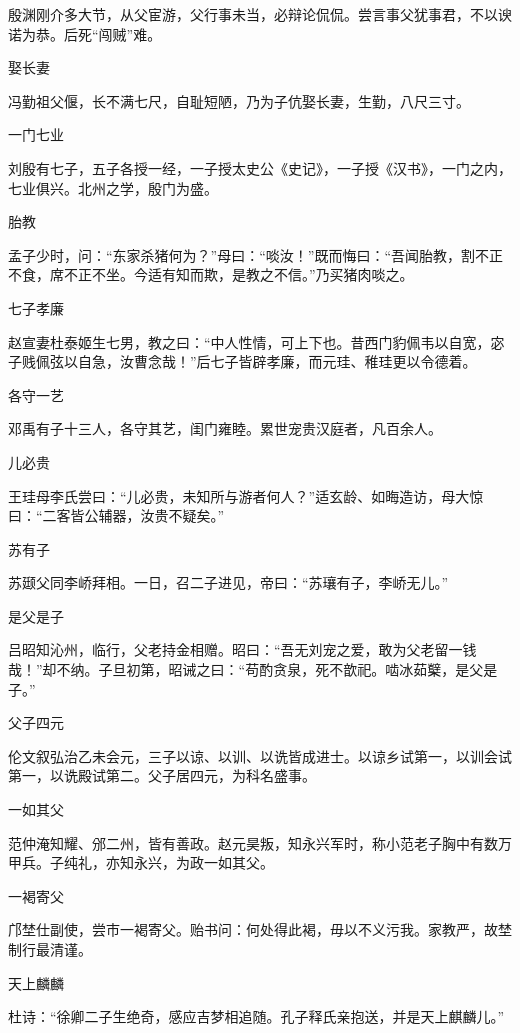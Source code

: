 \documentclass[a4paper,12pt,UTF8,twoside]{ctexbook}
\begin{document}
    殷渊刚介多大节，从父宦游，父行事未当，必辩论侃侃。尝言事父犹事君，不以谀诺为恭。后死“闯贼”难。
    
    娶长妻
    
    冯勤祖父偃，长不满七尺，自耻短陋，乃为子伉娶长妻，生勤，八尺三寸。
    
    一门七业
    
    刘殷有七子，五子各授一经，一子授太史公《史记》，一子授《汉书》，一门之内，七业俱兴。北州之学，殷门为盛。
    
    胎教
    
    孟子少时，问：“东家杀猪何为？”母曰：“啖汝！”既而悔曰：“吾闻胎教，割不正不食，席不正不坐。今适有知而欺，是教之不信。”乃买猪肉啖之。
    
    七子孝廉
    
    赵宣妻杜泰姬生七男，教之曰：“中人性情，可上下也。昔西门豹佩韦以自宽，宓子贱佩弦以自急，汝曹念哉！”后七子皆辟孝廉，而元珪、稚珪更以令德着。
    
    各守一艺
    
    邓禹有子十三人，各守其艺，闺门雍睦。累世宠贵汉庭者，凡百余人。
    
    儿必贵
    
    王珪母李氏尝曰：“儿必贵，未知所与游者何人？”适玄龄、如晦造访，母大惊曰：“二客皆公辅器，汝贵不疑矣。”
    
    苏有子
    
    苏颋父同李峤拜相。一日，召二子进见，帝曰：“苏瓖有子，李峤无儿。”
    
    是父是子
    
    吕昭知沁州，临行，父老持金相赠。昭曰：“吾无刘宠之爱，敢为父老留一钱哉！”却不纳。子旦初第，昭诫之曰：“苟酌贪泉，死不歆祀。啮冰茹櫱，是父是子。”
    
    父子四元
    
    伦文叙弘治乙未会元，三子以谅、以训、以诜皆成进士。以谅乡试第一，以训会试第一，以诜殿试第二。父子居四元，为科名盛事。
    
    一如其父
    
    范仲淹知耀、邠二州，皆有善政。赵元昊叛，知永兴军时，称小范老子胸中有数万甲兵。子纯礼，亦知永兴，为政一如其父。
    
    一褐寄父
    
    邝埜仕副使，尝市一褐寄父。贻书问：何处得此褐，毋以不义污我。家教严，故埜制行最清谨。
    
    天上麟麟
    
    杜诗：“徐卿二子生绝奇，感应吉梦相追随。孔子释氏亲抱送，并是天上麒麟儿。”
    
\end{document}
